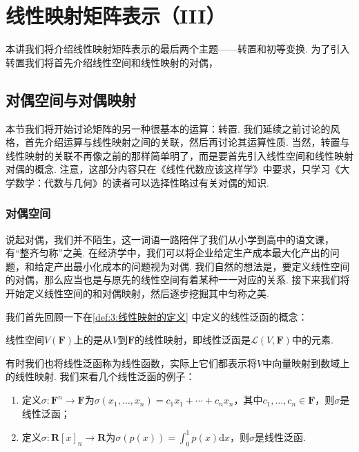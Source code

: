 \chapter{线性映射矩阵表示（III）}

本讲我们将介绍线性映射矩阵表示的最后两个主题——转置和初等变换. 为了引入转置我们将首先介绍线性空间和线性映射的对偶，

\section{对偶空间与对偶映射}

本节我们将开始讨论矩阵的另一种很基本的运算：转置. 我们延续之前讨论的风格，首先介绍运算与线性映射之间的关联，然后再讨论其运算性质. 当然，转置与线性映射的关联不再像之前的那样简单明了，而是要首先引入线性空间和线性映射对偶的概念. 注意，这部分内容只在《线性代数应该这样学》中要求，只学习《大学数学：代数与几何》的读者可以选择性略过有关对偶的知识.

\subsection{对偶空间}

说起对偶，我们并不陌生，这一词语一路陪伴了我们从小学到高中的语文课，有``整齐匀称''之美. 在经济学中，我们可以将企业给定生产成本最大化产出的问题，和给定产出最小化成本的问题视为对偶. 我们自然的想法是，要定义线性空间的对偶，那么应当也是与原先的线性空间有着某种一一对应的关系. 接下来我们将开始定义线性空间的和对偶映射，然后逐步挖掘其中匀称之美.

我们首先回顾一下在\autoref{def:3:线性映射的定义} 中定义的线性泛函的概念：
\begin{definition}[线性泛函] 
    线性空间$V(\mathbf{F})$上的是从$V$到$\mathbf{F}$的线性映射，即线性泛函是$\mathcal{L}(V,\mathbf{F})$中的元素.
\end{definition}
有时我们也将线性泛函称为线性函数，实际上它们都表示将$V$中向量映射到数域上的线性映射. 我们来看几个线性泛函的例子：
\begin{enumerate}
    \item 定义$\sigma:\mathbf{F}^n\to\mathbf{F}$为$\sigma(x_1,\ldots,x_n)=c_1x_1+\cdots+c_nx_n$，其中$c_1,\ldots,c_n\in\mathbf{F}$，则$\sigma$是线性泛函；

    \item 定义$\sigma:\mathbf{R}[x]_n\to\mathbf{R}$为$\sigma(p(x))=\displaystyle\int_0^1p(x)\mathrm{d}x$，则$\sigma$是线性泛函.
\end{enumerate}

